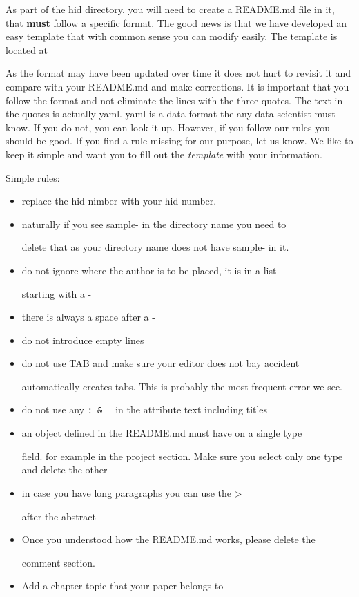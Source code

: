 As part of the hid directory, you will need to create a README.md file
in it, that \textbf{must} follow a specific format. The good news is
that we have developed an easy template that with common sense you can
modify easily. The template is located at


As the format may have been updated over time it does not hurt to
revisit it and compare with your README.md and make corrections. It is
important that you follow the format and not eliminate the lines with
the three quotes. The text in the quotes is actually yaml. yaml is a
data format the any data scientist must know. If you do not, you can
look it up. However, if you follow our rules you should be good. If you
find a rule missing for our purpose, let us know. We like to keep it
simple and want you to fill out the \emph{template} with your
information.

Simple rules:

\begin{itemize}

\item
  replace the hid nimber with your hid number.
\item naturally if you see sample- in the directory name you need to

  delete that as your directory name does not have sample- in it.
\item do not ignore where the author is to be placed, it is in a list

  starting with a -
\item there is always a space after a -

\item do not introduce empty lines

\item do not use TAB and make sure your editor does not bay accident

  automatically creates tabs. This is probably the most frequent error
  we see.
\item do not use any \verb|: & _| in the attribute text including titles

\item an object defined in the README.md must have on a single type

  field.  for example in the project section. Make sure you select
  only one type and delete the other
\item in case you have long paragraphs you can use the \textgreater{}

  after the abstract
\item Once you understood how the README.md works, please delete the

  comment section.
\item Add a chapter topic that your paper belongs to

\end{itemize}

